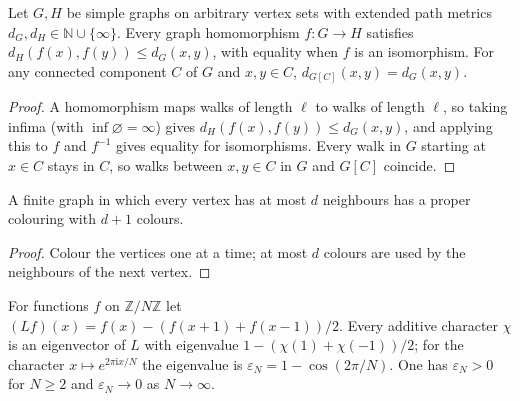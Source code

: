 \begin{lemma}
    \label{thm:qc_graph_edist_transport}
    \leanok
    Let $G,H$ be simple graphs on arbitrary vertex sets with extended path
    metrics $d_G,d_H\in\mathbb N\cup\{\infty\}$. Every graph homomorphism
    $f\colon G\to H$ satisfies $d_H(f(x),f(y))\le d_G(x,y)$, with equality when
    $f$ is an isomorphism. For any connected component $C$ of $G$ and
    $x,y\in C$, $d_{G[C]}(x,y)=d_G(x,y)$.
\end{lemma}

\begin{proof}\leanok
    A homomorphism maps walks of length $\ell$ to walks of length $\ell$, so
    taking infima (with $\inf\varnothing=\infty$) gives
    $d_H(f(x),f(y))\le d_G(x,y)$, and applying this to $f$ and $f^{-1}$ gives
    equality for isomorphisms. Every walk in $G$ starting at $x\in C$ stays in
    $C$, so walks between $x,y\in C$ in $G$ and $G[C]$ coincide.
\end{proof}

\begin{lemma}
    \label{thm:frustration_free_area_law_greedy_colouring}
    \leanok
    A finite graph in which every vertex has at most $d$ neighbours has a
    proper colouring with $d+1$ colours.
\end{lemma}

\begin{proof}\leanok
    Colour the vertices one at a time; at most $d$ colours are used by the
    neighbours of the next vertex.
\end{proof}

\begin{lemma}
    \label{lem:cycle_laplacian_fourier}
    \leanok
    For functions $f$ on $\mathbb Z/N\mathbb Z$ let
    $(Lf)(x)=f(x)-(f(x+1)+f(x-1))/2$. Every additive character $\chi$ is an
    eigenvector of $L$ with eigenvalue $1-(\chi(1)+\chi(-1))/2$; for the
    character $x\mapsto e^{2\pi\mathrm ix/N}$ the eigenvalue is
    $\varepsilon_N=1-\cos(2\pi/N)$. One has $\varepsilon_N>0$ for $N\ge2$ and
    $\varepsilon_N\to0$ as $N\to\infty$.
\end{lemma}

